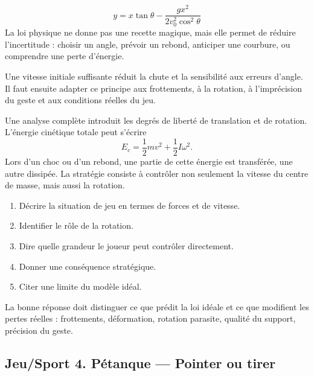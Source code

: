 \documentclass[11pt,a4paper]{article}
\begin{document}
\begin{theorembox}
\[
y=x\tan\theta-\frac{gx^2}{2v_0^2\cos^2\theta}
\]
La loi physique ne donne pas une recette magique, mais elle permet de réduire l'incertitude : choisir un angle, prévoir un rebond, anticiper une courbure, ou comprendre une perte d'énergie.
\end{theorembox}

\begin{methodebox}
Une vitesse initiale suffisante réduit la chute et la sensibilité aux erreurs d'angle.
Il faut ensuite adapter ce principe aux frottements, à la rotation, à l'imprécision du geste et aux conditions réelles du jeu.
\end{methodebox}

\begin{approfondissementbox}
Une analyse complète introduit les degrés de liberté de translation et de rotation. L'énergie cinétique totale peut s'écrire
\[
E_c=\frac12mv^2+\frac12I\omega^2.
\]
Lors d'un choc ou d'un rebond, une partie de cette énergie est transférée, une autre dissipée. La stratégie consiste à contrôler non seulement la vitesse du centre de masse, mais aussi la rotation.
\end{approfondissementbox}

\begin{exercicebox}
\begin{enumerate}
  \item Décrire la situation de jeu en termes de forces et de vitesse.
  \item Identifier le rôle de la rotation.
  \item Dire quelle grandeur le joueur peut contrôler directement.
  \item Donner une conséquence stratégique.
  \item Citer une limite du modèle idéal.
\end{enumerate}
\end{exercicebox}

\begin{corrigebox}[Indication]
La bonne réponse doit distinguer ce que prédit la loi idéale et ce que modifient les pertes réelles : frottements, déformation, rotation parasite, qualité du support, précision du geste.
\end{corrigebox}


\subsection{Jeu/Sport 4. Pétanque — Pointer ou tirer}
\end{document}
